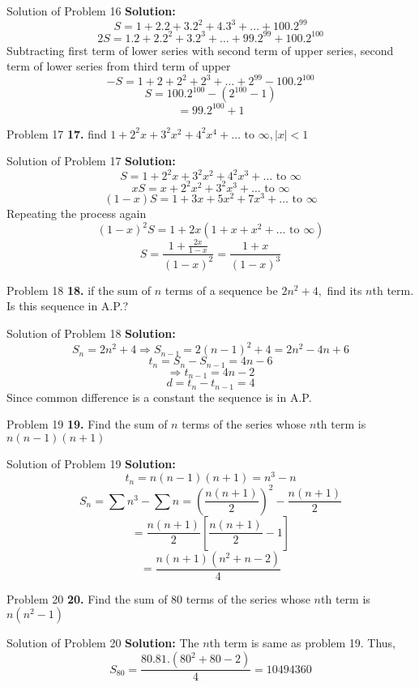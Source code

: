 \documentclass[aspectratio=1610,8pt]{beamer}
\begin{document}
\begin{frame}{Solution of Problem 16}
  \textbf{Solution:} $$S = 1 + 2.2 + 3.2^2 + 4.3^3 + \ldots + 100.2^{99}$$
  $$2S = 1.2 + 2.2^2 + 3.2^3 + \ldots + 99.2^{99} + 100.2^{100}$$
  Subtracting first term of lower series with second term of upper series, second term of lower series from third term of upper
  $$-S = 1 + 2 + 2^2 + 2^3 + \ldots + 2^{99} - 100.2^{100}$$
  $$S = 100.2^{100} - (2^{100} - 1)$$
  $$= 99.2^{100} + 1$$
\end{frame}
\begin{frame}{Problem 17}
  \textbf{17.} find $1 + 2^2x + 3^2x^2 + 4^2x^4 + \ldots \text{~to~}\infty, |x| < 1$
\end{frame}
\begin{frame}{Solution of Problem 17}
  \textbf{Solution:}$$S = 1 + 2^2x + 3^2x^2 + 4^2x^3 + \ldots \text{~to~}\infty$$
  $$xS = x + 2^2x^2 + 3^2x^3 + \ldots \text{~to~}\infty$$
  $$(1 - x)S = 1 + 3x + 5x^2 + 7x^3 + \ldots \text{~to~}\infty$$
  Repeating the process again
  $$(1 - x)^2S = 1 + 2x(1 + x + x^2 + \ldots \text{~to~}\infty)$$
  $$S = \frac{1 + \frac{2x}{1 - x}}{(1 - x)^2} = \frac{1 + x}{(1 - x)^3}$$
\end{frame}
\begin{frame}{Problem 18}
  \textbf{18.} if the sum of $n$ terms of a sequence be $2n^2 + 4,$ find its $n$th term. Is this sequence in A.P.?
\end{frame}
\begin{frame}{Solution of Problem 18}
  \textbf{Solution:}$$S_n = 2n^2 + 4 \Rightarrow S_{n - 1} = 2(n - 1)^2 + 4 = 2n^2 -4n +6$$
  $$t_n = S_n - S_{n - 1} = 4n - 6$$
  $$\Rightarrow t_{n - 1} = 4n - 2$$
  $$d = t_n - t_{n - 1} = 4$$
  Since common difference is a constant the sequence is in A.P.
\end{frame}
\begin{frame}{Problem 19}
  \textbf{19.} Find the sum of $n$ terms of the series whose $n$th term is $n(n - 1)(n + 1)$
\end{frame}
\begin{frame}{Solution of Problem 19}
  \textbf{Solution:}$$t_n = n(n - 1)(n + 1) = n^3 - n$$
  $$S_n = \sum n^3 - \sum n = \left(\frac{n(n + 1)}{2}\right)^2 - \frac{n(n + 1)}{2}$$
  $$= \frac{n(n + 1)}{2}\left[\frac{n(n + 1)}{2} - 1\right]$$
  $$= \frac{n(n + 1)(n^2 + n - 2)}{4}$$
\end{frame}
\begin{frame}{Problem 20}
  \textbf{20.} Find the sum of $80$ terms of the series whose $n$th term is $n(n^2 - 1)$
\end{frame}
\begin{frame}{Solution of Problem 20}
  \textbf{Solution:} The $n$th term is same as problem 19. Thus,
  $$S_{80} = \frac{80.81.(80^2 + 80 - 2)}{4} = 10494360$$
\end{frame}
\end{document}
